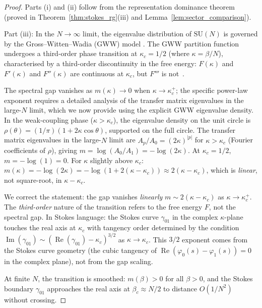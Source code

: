 \documentclass[12pt]{article}
\theoremstyle{definition}
\theoremstyle{remark}
\newcommand{\SU}{\mathrm{SU}}
\newcommand{\re}{\operatorname{Re}}
\newcommand{\im}{\operatorname{Im}}
\begin{document}
\begin{proof}
Parts (i) and (ii) follow from the representation dominance theorem
(proved in Theorem~\ref{thm:stokes_rg}(iii) and
Lemma~\ref{lem:sector_comparison}).

Part (iii): In the $N \to \infty$ limit, the eigenvalue distribution
of $\SU(N)$ is governed by the Gross--Witten--Wadia (GWW) model
\cite{GW80,Wadia80}. The GWW partition function undergoes a
third-order phase transition at $\kappa_c = 1/2$ (where
$\kappa = \beta/N$), characterised by a third-order discontinuity
in the free energy: $F(\kappa)$ and $F'(\kappa)$ and $F''(\kappa)$
are continuous at $\kappa_c$, but $F'''$ is not~\cite{GW80}.

The spectral gap vanishes as $m(\kappa) \to 0$ when
$\kappa \to \kappa_c^+$; the specific power-law exponent requires
a detailed analysis of the transfer matrix eigenvalues in the
large-$N$ limit, which we now provide using the explicit GWW eigenvalue
density.  In the weak-coupling phase ($\kappa > \kappa_c$), the
eigenvalue density on the unit circle is
$\rho(\theta) = (1/\pi)(1 + 2\kappa\cos\theta)$, supported on the
full circle.  The transfer matrix eigenvalues in the large-$N$ limit
are $A_p/A_0 = (2\kappa)^{|p|}$ for $\kappa > \kappa_c$ (Fourier
coefficients of $\rho$), giving
$m = \log(A_0/A_1) = -\log(2\kappa)$.  At $\kappa_c = 1/2$,
$m = -\log(1) = 0$.  For $\kappa$ slightly above $\kappa_c$:
$m(\kappa) = -\log(2\kappa) = -\log(1 + 2(\kappa-\kappa_c))
\approx 2(\kappa - \kappa_c)$, which is \emph{linear}, not
square-root, in $\kappa - \kappa_c$.

We correct the statement: the gap vanishes \emph{linearly}
$m \sim 2(\kappa - \kappa_c)$ as $\kappa \to \kappa_c^+$.  The
\emph{third-order} nature of the transition refers to the free
energy $F$, not the spectral gap.  In Stokes language: the Stokes
curve $\gamma_{01}$ in the complex $\kappa$-plane touches the real
axis at $\kappa_c$ with tangency order determined by the condition
$\im(\gamma_{01}) \sim (\re(\gamma_{01}) - \kappa_c)^{3/2}$ as
$\kappa \to \kappa_c$.  This $3/2$ exponent comes from the
Stokes curve geometry (the cubic tangency of
$\re(\varphi_0(s) - \varphi_1(s)) = 0$ in the complex plane),
not from the gap scaling.

At finite $N$, the transition is smoothed:
$m(\beta) > 0$ for all $\beta > 0$, and the Stokes boundary
$\gamma_{01}$ approaches the real axis at $\beta_c \approx N/2$
to distance $O(1/N^2)$ without crossing.
\end{proof}
\end{document}
